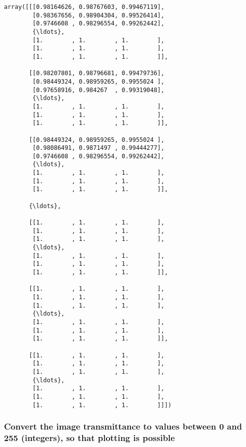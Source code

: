 \documentclass[11pt]{article}
\makeatletter
\newcommand{\boxspacing}{\kern\kvtcb@left@rule\kern\kvtcb@boxsep}
\newcommand{\prompt}[4]{
        {\ttfamily\llap{{\color{#2}[#3]:\hspace{3pt}#4}}\vspace{-\baselineskip}}
    }
\makeatother
\begin{document}
            \begin{tcolorbox}[breakable, size=fbox, boxrule=.5pt, pad at break*=1mm, opacityfill=0]
\prompt{Out}{outcolor}{234}{\boxspacing}
\begin{Verbatim}[commandchars=\\\{\}]
array([[[0.98164626, 0.98767603, 0.99467119],
        [0.98367656, 0.98904304, 0.99526414],
        [0.9746608 , 0.98296554, 0.99262442],
        {\ldots},
        [1.        , 1.        , 1.        ],
        [1.        , 1.        , 1.        ],
        [1.        , 1.        , 1.        ]],

       [[0.98207801, 0.98796681, 0.99479736],
        [0.98449324, 0.98959265, 0.9955024 ],
        [0.97658916, 0.984267  , 0.99319048],
        {\ldots},
        [1.        , 1.        , 1.        ],
        [1.        , 1.        , 1.        ],
        [1.        , 1.        , 1.        ]],

       [[0.98449324, 0.98959265, 0.9955024 ],
        [0.98086491, 0.9871497 , 0.99444277],
        [0.9746608 , 0.98296554, 0.99262442],
        {\ldots},
        [1.        , 1.        , 1.        ],
        [1.        , 1.        , 1.        ],
        [1.        , 1.        , 1.        ]],

       {\ldots},

       [[1.        , 1.        , 1.        ],
        [1.        , 1.        , 1.        ],
        [1.        , 1.        , 1.        ],
        {\ldots},
        [1.        , 1.        , 1.        ],
        [1.        , 1.        , 1.        ],
        [1.        , 1.        , 1.        ]],

       [[1.        , 1.        , 1.        ],
        [1.        , 1.        , 1.        ],
        [1.        , 1.        , 1.        ],
        {\ldots},
        [1.        , 1.        , 1.        ],
        [1.        , 1.        , 1.        ],
        [1.        , 1.        , 1.        ]],

       [[1.        , 1.        , 1.        ],
        [1.        , 1.        , 1.        ],
        [1.        , 1.        , 1.        ],
        {\ldots},
        [1.        , 1.        , 1.        ],
        [1.        , 1.        , 1.        ],
        [1.        , 1.        , 1.        ]]])
\end{Verbatim}
\end{tcolorbox}
        
    \hypertarget{convert-the-image-transmittance-to-values-between-0-and-255-integers-so-that-plotting-is-possible}{%
\subsubsection{Convert the image transmittance to values between 0 and
255 (integers), so that plotting is
possible}\label{convert-the-image-transmittance-to-values-between-0-and-255-integers-so-that-plotting-is-possible}}
\end{document}
